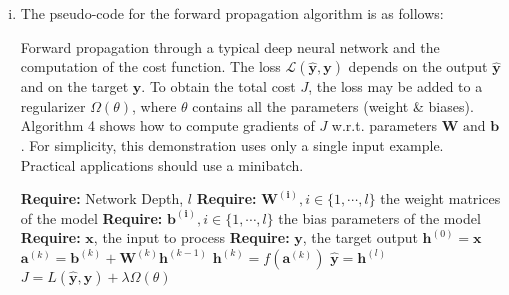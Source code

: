 \documentclass[fleqn]{article}
\begin{document}
\begin{enumerate}[a)]
	\begin{enumerate}[i)]
		\item
		The pseudo-code for the forward propagation algorithm is as follows:
        \begin{algorithm}
            \caption{Forward propagation through a typical deep neural network and the computation of the cost 
            function. The loss $\mathcal{L}(\bm{\hat{y}}, \bm{y})$ depends on the output $\bm{\hat{y}}$ and on the 
            target $\bm{y}$. To obtain the total cost $J$, the loss may be added to a regularizer $\Omega(\theta)$, 
            where $\theta$ contains all the parameters (weight \& biases). Algorithm 4 shows how to compute 
            gradients of $J$ w.r.t. parameters $\bm{W} \text{ and } \bm{b}$. For simplicity, this demonstration uses 
            only a single input example. Practical applications should use a minibatch.}\label{forwardpropMLP}
            \begin{algorithmic}[1]
                \State \textbf{Require: } Network Depth, $l$
                \State \textbf{Require: } $\bm{W^{(i)}}, i \in \{1, \cdots, l\}$ the weight matrices of the model 
                \State \textbf{Require: } $\bm{b^{(i)}}, i \in \{1, \cdots, l\}$ the bias parameters of the model 
                \State \textbf{Require: } $\bm{x}$, the input to process
                \State \textbf{Require: } $\bm{y}$, the target output
                \State $\bm{h}^{(0)} = \bm{x}$
                \State $\bm{a}^{(k)} = \bm{b}^{(k)} + \bm{W}^{(k)} \bm{h}^{(k-1)}$
                \State $\bm{h}^{(k)} = f(\bm{a}^{(k)})$
                \State $\hat{\bm{y}} = \bm{h}^{(l)}$
                \State $J = L(\hat{\bm{y}}, \bm{y}) + \lambda \Omega(\theta)$
            \end{algorithmic}
        \end{algorithm}
        \hfill \break
        

\end{enumerate}
\end{enumerate}
\end{document}
